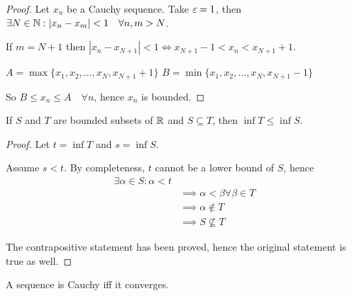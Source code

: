 \documentclass[a4paper,10pt]{article}
\begin{document}
\begin{proof}
	Let $x_n$ be a Cauchy sequence. Take $\varepsilon = 1$, then $\exists
	N \in \mathbb{N} : |x_n - x_m| < 1 \quad \forall n,m > N$.

	If $m = N+1$ then $|x_n - x_{N+1}| < 1 \iff x_{N+1} - 1 < x_n < x_{N+1} + 1$.

	$A = \max\{x_1, x_2, \ldots, x_N, x_{N+1}+1\}$
	$B = \min\{x_1, x_2, \ldots, x_N, x_{N+1}-1\}$

	So $B \leq x_n \leq A \quad \forall n$, hence $x_n$ is bounded.
\end{proof}

\begin{prop}
	If $S$ and $T$ are bounded subsets of $\mathbb{R}$ and $S \subseteq T$,
	then $\inf T \leq \inf S$.
\end{prop}

\begin{proof}
	Let $t = \inf T$ and $s = \inf S$.

	Assume $s<t$. By completeness, $t$ cannot be a lower bound of
	$S$, hence
	\begin{align*}
		\exists \alpha \in S : \alpha < t \\
		&\implies \alpha < \beta \forall \beta \in T \\
		&\implies \alpha \notin T \\
		&\implies S \nsubseteq T
	\end{align*}

	The contrapositive statement has been proved, hence the original
	statement is true as well.
\end{proof}

\begin{thm}
	A sequence is Cauchy iff it converges.
\end{thm}
\end{document}
